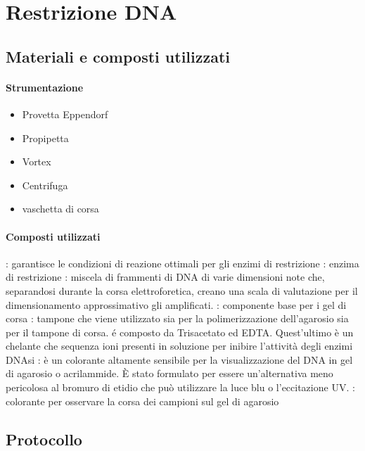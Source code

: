 \section{Restrizione DNA}
\subsection{Materiali e composti utilizzati}
\paragraph{Strumentazione}
\begin{itemize}[person]
	\item Provetta \foreignlanguage{german}{Eppendorf}
	\item Propipetta
	\item \foreignlanguage{english}{Vortex}
	\item Centrifuga
	\item vaschetta di corsa
\end{itemize}

\paragraph{Composti utilizzati}
\begin{itemize}[person]
	\itemb[Buffer 10X]: garantisce le condizioni di reazione ottimali per gli enzimi di restrizione
	\itemb[DNA]
	: enzima di restrizione 
	: miscela di frammenti di DNA di varie dimensioni note che, separandosi durante la corsa elettroforetica, creano una scala di valutazione per il dimensionamento approssimativo gli amplificati.
	\itemb[Agarosio]: componente base per i gel di corsa
	\itemb[TAE 50X]: tampone che viene utilizzato sia per la polimerizzazione dell'agarosio sia per il tampone di corsa. é composto da Trisacetato ed EDTA. Quest'ultimo è un chelante che sequenza ioni  presenti in soluzione per inibire l'attività degli enzimi DNAsi
	\itemb[SyberSafe]: è un colorante altamente sensibile per la visualizzazione del DNA in gel di agarosio o acrilammide. È stato formulato per essere un'alternativa meno pericolosa al bromuro di etidio che può utilizzare la luce blu o l'eccitazione UV. 
	: colorante per osservare la corsa dei campioni sul gel di agarosio
\end{itemize}

\subsection{Protocollo}
